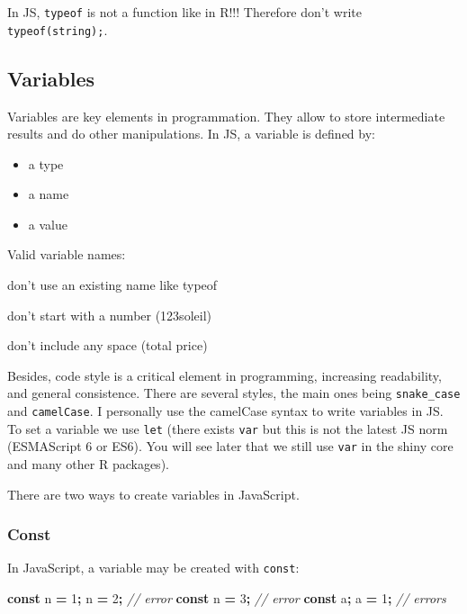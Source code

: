 \documentclass[]{book}
\newenvironment{Shaded}{\begin{snugshade}}{\end{snugshade}}
\newcommand{\CommentTok}[1]{\textcolor[rgb]{0.56,0.35,0.01}{\textit{#1}}}
\newcommand{\DecValTok}[1]{\textcolor[rgb]{0.00,0.00,0.81}{#1}}
\newcommand{\KeywordTok}[1]{\textcolor[rgb]{0.13,0.29,0.53}{\textbf{#1}}}
\newcommand{\NormalTok}[1]{#1}
\newcommand{\OperatorTok}[1]{\textcolor[rgb]{0.81,0.36,0.00}{\textbf{#1}}}
\providecommand{\tightlist}{%
  \setlength{\itemsep}{0pt}\setlength{\parskip}{0pt}}
\begin{document}
In JS, \texttt{typeof} is not a function like in R!!! Therefore don't write \texttt{typeof(\textquotesingle{}string\textquotesingle{});}.

\hypertarget{variables}{%
\subsection{Variables}\label{variables}}

Variables are key elements in programmation. They allow to store intermediate results and do other manipulations. In JS, a variable is defined by:

\begin{itemize}
\tightlist
\item
  a type
\item
  a name
\item
  a value
\end{itemize}

Valid variable names:

don't use an existing name like typeof

don't start with a number (123soleil)

don't include any space (total price)

Besides, code style is a critical element in programming, increasing readability, and general consistence. There are several styles, the main ones being \texttt{snake\_case} and \texttt{camelCase}. I personally use the camelCase syntax to write variables in JS. To set a variable we use \texttt{let} (there exists \texttt{var} but this is not the latest JS norm (ESMAScript 6 or ES6). You will see later that we still use \texttt{var} in the shiny core and many other R packages).

There are two ways to create variables in JavaScript.

\hypertarget{const}{%
\subsubsection{Const}\label{const}}

In JavaScript, a variable may be created with \texttt{const}:

\begin{Shaded}
\begin{Highlighting}[]
\KeywordTok{const}\NormalTok{ n }\OperatorTok{=} \DecValTok{1}\OperatorTok{;}
\NormalTok{n }\OperatorTok{=} \DecValTok{2}\OperatorTok{;} \CommentTok{// error}
\KeywordTok{const}\NormalTok{ n }\OperatorTok{=} \DecValTok{3}\OperatorTok{;} \CommentTok{// error}
\KeywordTok{const}\NormalTok{ a}\OperatorTok{;}
\NormalTok{a }\OperatorTok{=} \DecValTok{1}\OperatorTok{;} \CommentTok{// errors}
\end{Highlighting}
\end{Shaded}
\end{document}
